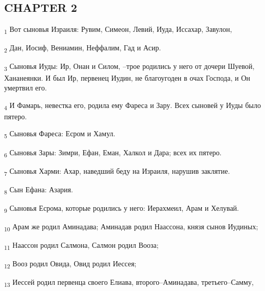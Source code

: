 \subsection{CHAPTER 2}
\begin{tcolorbox}
\textsubscript{1} Вот сыновья Израиля: Рувим, Симеон, Левий, Иуда, Иссахар, Завулон,
\end{tcolorbox}
\begin{tcolorbox}
\textsubscript{2} Дан, Иосиф, Вениамин, Неффалим, Гад и Асир.
\end{tcolorbox}
\begin{tcolorbox}
\textsubscript{3} Сыновья Иуды: Ир, Онан и Силом, --трое родились у него от дочери Шуевой, Хананеянки. И был Ир, первенец Иудин, не благоугоден в очах Господа, и Он умертвил его.
\end{tcolorbox}
\begin{tcolorbox}
\textsubscript{4} И Фамарь, невестка его, родила ему Фареса и Зару. Всех сыновей у Иуды было пятеро.
\end{tcolorbox}
\begin{tcolorbox}
\textsubscript{5} Сыновья Фареса: Есром и Хамул.
\end{tcolorbox}
\begin{tcolorbox}
\textsubscript{6} Сыновья Зары: Зимри, Ефан, Еман, Халкол и Дара; всех их пятеро.
\end{tcolorbox}
\begin{tcolorbox}
\textsubscript{7} Сыновья Харми: Ахар, наведший беду на Израиля, нарушив заклятие.
\end{tcolorbox}
\begin{tcolorbox}
\textsubscript{8} Сын Ефана: Азария.
\end{tcolorbox}
\begin{tcolorbox}
\textsubscript{9} Сыновья Есрома, которые родились у него: Иерахмеил, Арам и Хелувай.
\end{tcolorbox}
\begin{tcolorbox}
\textsubscript{10} Арам же родил Аминадава; Аминадав родил Наассона, князя сынов Иудиных;
\end{tcolorbox}
\begin{tcolorbox}
\textsubscript{11} Наассон родил Салмона, Салмон родил Вооза;
\end{tcolorbox}
\begin{tcolorbox}
\textsubscript{12} Вооз родил Овида, Овид родил Иессея;
\end{tcolorbox}
\begin{tcolorbox}
\textsubscript{13} Иессей родил первенца своего Елиава, второго--Аминадава, третьего--Самму,
\end{tcolorbox}
